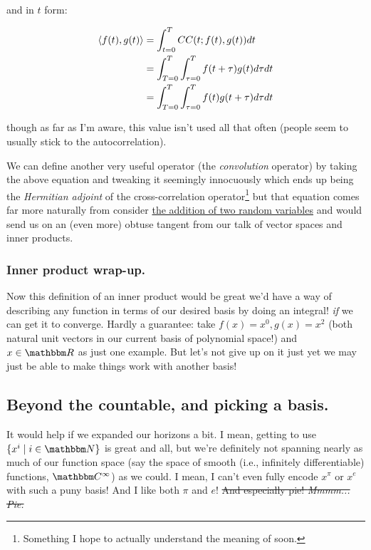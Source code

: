\documentclass[letterpaper,12pt]{report}
\begin{document}
and in \(t\) form:

\[ \begin{split}
  \innerprod[f(t)][g(t)] &= \int_{t=0}^{T} CC(t; f(t), g(t)) dt \\
  &= \int_{T = 0}^{T} \int_{\tau = 0}^{T} f(t + \tau) g(t) d\tau dt \\
  &= \int_{T = 0}^{T} \int_{\tau = 0}^{T} f(t) g(t + \tau) d\tau dt
\end{split}
\]

though as far as I'm aware, this value isn't used all that
often (people seem to usually stick to the autocorrelation). \par

We can define another very useful operator
(the \emph{convolution} operator)
by taking the above equation and tweaking it seemingly innocuously
\textemdash{} which ends up being the \emph{Hermitian adjoint}
of the cross-correlation operator\footnote{
  Something I hope to actually understand the meaning of soon.
} \textemdash{}
but that equation comes far more naturally from consider
\href{https://stats.stackexchange.com/a/332127}{the addition of two random variables}
and would send us on an (even more) obtuse tangent from our talk of
vector spaces and inner products. 

\subsubsection*{Inner product wrap-up.}

Now this definition of an inner product would be great 
\textemdash{}
we'd have a way of describing any function in terms of 
our desired basis by doing an integral!
\textemdash{}
\emph{if}
we can get it to converge.
Hardly a guarantee: take \(f(x) = x^0, g(x) = x^2\)
(both natural unit vectors in 
our current basis of polynomial space!)
and \(x \in \domain{R}\) as just one example.
But let's not give up on it just yet \textemdash{}
we may just be able to make things work with another basis!

\subsection{Beyond the countable, and picking a basis.}

It would help if
we expanded our horizons a bit.
I mean, getting to use \(\{x^i \mid i \in \domain{N}\}\)
is great and all, but we're definitely not spanning nearly
as much of our function space (say the space of smooth
(i.e., infinitely differentiable) functions, 
\(\domain{C}^\infty\)) as we could.
I mean, I can't even fully encode \(x^\pi\) or \(x^e\) 
with such a puny basis! And I like both \(\pi\) and \(e\)!
\sout{And especially pie! \textit{Mmmm... Pie.}}\par
\end{document}
